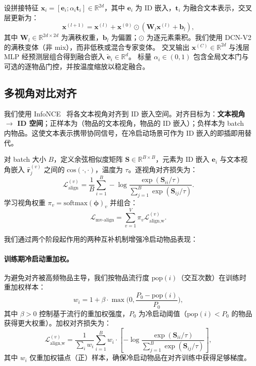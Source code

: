 \documentclass[sigconf,natbib=true,anonymous]{acmart}
\newcommand{\InfoNCE}{InfoNCE\xspace}
\begin{document}
设拼接特征 $\mathbf{x}_i=[\mathbf{e}_i;\alpha_i \mathbf{t}_i] \in \mathbb{R}^{2d}$，其中 $\mathbf{e}_i$ 为 ID 嵌入，$\mathbf{t}_i$ 为融合文本表示，交叉层更新为：
\begin{equation}
  \mathbf{x}^{(l+1)} = \mathbf{x}^{(l)} + \mathbf{x}^{(0)} \odot (\mathbf{W}_l\mathbf{x}^{(l)} + \mathbf{b}_l),
\end{equation}
其中 $\mathbf{W}_l \in \mathbb{R}^{2d \times 2d}$ 为满秩权重，$\mathbf{b}_l$ 为偏置；$\odot$ 为逐元素乘积。我们使用 DCN-V2 的满秩变体（非 mix），而非低秩或混合专家变体。
交叉输出 $\mathbf{x}^{(C)} \in \mathbb{R}^{2d}$ 与浅层 MLP 经预测层组合得到融合嵌入 $\tilde{\mathbf{e}}_i \in \mathbb{R}^d$。
标量 $\alpha_i \in (0,1)$ 包含全局文本门与可选的逐物品门控，并按温度缩放以稳定融合。

\subsection{多视角对比对齐}\label{sec:align}
我们使用 \InfoNCE~\cite{oord2018cpc} 将各文本视角对齐到 ID 嵌入空间。对齐目标为：\textbf{文本视角 $\to$ ID 空间}；正样本为（物品的文本视角，物品的 ID 嵌入）；负样本为 batch 内物品。这使文本表示携带协同信号，在冷启动场景可作为 ID 嵌入的即插即用替代。

对 batch 大小 $B$，定义余弦相似度矩阵 $\mathbf{S} \in \mathbb{R}^{B \times B}$，元素为 ID 嵌入 $\mathbf{e}_i$ 与文本视角嵌入 $\hat{\mathbf{r}}_{j}^{(v)}$ 之间的 $\mathrm{cos}(\cdot,\cdot)$，温度为 $\tau$。逐视角对齐损失为：
\begin{equation}
  \mathcal{L}_{\text{align}}^{(v)} =
  \frac{1}{B}\sum_{i=1}^{B}
  -\log \frac{\exp(\mathbf{S}_{ii}/\tau)}{\sum_{j=1}^{B}\exp(\mathbf{S}_{ij}/\tau)}.
\end{equation}
学习视角权重 $\pi_v=\mathrm{softmax}(\boldsymbol{\phi})_v$ 并组合：
\begin{equation}
  \mathcal{L}_{\text{mv-align}} = \sum_{v=1}^{V}\pi_v \mathcal{L}_{\text{align,w}}^{(v)}.
\end{equation}

我们通过两个阶段起作用的两种互补机制增强冷启动物品表现：

\paragraph{训练期冷启动重加权。}
为避免对齐被高频物品主导，我们按物品流行度 $\mathrm{pop}(i)$（交互次数）在训练时重加权样本：
\begin{equation}
  w_i = 1 + \beta\cdot \max\Big(0, \frac{P_0-\mathrm{pop}(i)}{P_0}\Big),
  \label{eq:cold_reweight}
\end{equation}
其中 $\beta>0$ 控制基于流行的重加权强度，$P_0$ 为冷启动阈值（$\mathrm{pop}(i) < P_0$ 的物品获得更大权重）。加权对齐损失为：
\begin{equation}
  \mathcal{L}_{\text{align,w}}^{(v)} =
  \frac{1}{\sum_i w_i}\sum_{i=1}^{B} w_i \cdot
  \left[-\log \frac{\exp(\mathbf{S}_{ii}/\tau)}{\sum_{j=1}^{B}\exp(\mathbf{S}_{ij}/\tau)}\right],
\end{equation}
其中 $w_i$ 仅重加权锚点（正）样本，确保冷启动物品在对齐训练中获得足够梯度。
\end{document}
